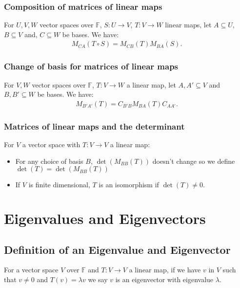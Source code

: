 \documentclass[a4paper, 12pt, twoside]{article}
\begin{document}
\newpage

\subsubsection{Composition of matrices of linear maps}

For $U, V, W$ vector spaces over $\mathbb{F}$, $S : U \to V$, 
$T : V \to W$ linear maps, let $A \subseteq U$, $B \subseteq V$
and, $C \subseteq W$ be bases. We have:
\begin{align*}
  M_{CA}(T \circ S) = M_{CB}(T)M_{BA}(S).
\end{align*}

\subsubsection{Change of basis for matrices of linear maps}

For $V, W$ vector spaces over $\mathbb{F}$, $T : V \to W$ a linear 
map, let $A, A' \subseteq V$ and $B, B' \subseteq W$ be bases. 
We have:
\begin{align*}
  M_{B'A'}(T) = C_{B'B}M_{BA}(T)C_{AA'}.
\end{align*}

\subsubsection{Matrices of linear maps and the determinant}

For $V$ a vector space with $T : V \to V$ a linear map:
\begin{itemize}
  \item For any choice of basis $B$, $\det(M_{BB}(T))$ doesn't change
  so we define $\det(T) = \det(M_{BB}(T))$
  \item If $V$ is finite dimensional, $T$ is an isomorphism if
  $\det(T) \neq 0$.
\end{itemize}

\section{Eigenvalues and Eigenvectors}

\subsection{Definition of an Eigenvalue and Eigenvector}

For a vector space $V$ over $\mathbb{F}$ and $T : V \to V$ a linear
map, if we have $v$ in $V$ such that $v \neq 0$ and $T(v) = \lambda v$
we say $v$ is an eigenvector with eigenvalue $\lambda$.
\end{document}
